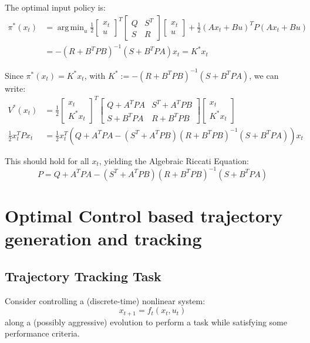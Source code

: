 \documentclass[openany]{book}
\DeclareMathOperator*{\argmin}{arg\,min}  %
\theoremstyle{definition}
\theoremstyle{remark}
\begin{document}
The optimal input policy is:
\begin{align*}
\pi^*(x_t) &= \argmin_u \frac{1}{2}\begin{bmatrix}
x_t \\ u
\end{bmatrix}^T \begin{bmatrix}
Q & S^T \\ S & R
\end{bmatrix} \begin{bmatrix}
x_t \\ u
\end{bmatrix} + \frac{1}{2}(Ax_t + Bu)^T P(Ax_t + Bu)\\
&= -(R + B^T PB)^{-1}(S + B^T PA)x_t = K^*x_t
\end{align*}

Since $\pi^*(x_t) = K^*x_t$, with $K^* := -(R + B^T PB)^{-1}(S + B^T PA)$, we can write:
\begin{align*}
V^*(x_t) &= \frac{1}{2}\begin{bmatrix}
x_t \\ K^*x_t
\end{bmatrix}^T \begin{bmatrix}
Q + A^T PA & S^T + A^T PB\\
S + B^T PA & R + B^T PB
\end{bmatrix} \begin{bmatrix}
x_t \\ K^*x_t
\end{bmatrix}\\
\frac{1}{2}x_t^T Px_t &= \frac{1}{2}x_t^T(Q + A^T PA - (S^T + A^T PB)(R + B^T PB)^{-1}(S + B^T PA))x_t
\end{align*}

This should hold for all $x_t$, yielding the Algebraic Riccati Equation:
\[
P = Q + A^T PA - (S^T + A^T PB)(R + B^T PB)^{-1}(S + B^T PA)
\]


\chapter{Optimal Control based trajectory generation and tracking}

\section{Trajectory Tracking Task}
Consider controlling a (discrete-time) nonlinear system:
\[
    x_{t+1} = f_t(x_t,u_t)
\]
along a (possibly aggressive) evolution to perform a task while satisfying some performance criteria.
\end{document}
